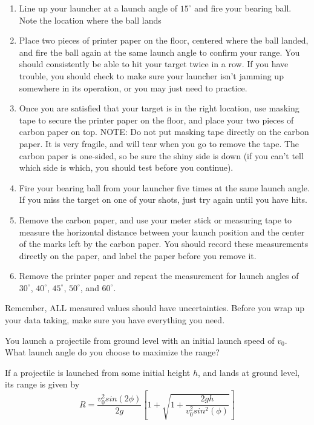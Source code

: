 \begin{enumerate}
    \item Line up your launcher at a launch angle of $15^\circ$ and fire your bearing ball. Note the location where the ball lands
    \item Place two pieces of printer paper on the floor, centered where the ball landed, and fire the ball again at the same launch angle to confirm your range. You should consistently be able to hit your target twice in a row. If you have trouble, you should check to make sure your launcher isn't jamming up somewhere in its operation, or you may just need to practice.
    \item Once you are satisfied that your target is in the right location, use masking tape to secure the printer paper on the floor, and place your two pieces of carbon paper on top.  NOTE: Do not put masking tape directly on the carbon paper. It is very fragile, and will tear when you go to remove the tape.  The carbon paper is one-sided, so be sure the shiny side is down (if you can't tell which side is which, you should test before you continue).
    \item Fire your bearing ball from your launcher five times at the same launch angle. If you miss the target on one of your shots, just try again until you have hits.
    \item Remove the carbon paper, and use your meter stick or measuring tape to measure the horizontal distance between your launch position and the center of the marks left by the carbon paper.  You should record these measurements directly on the paper, and label the paper before you remove it.
    \item Remove the printer paper and repeat the measurement for launch angles of $30^\circ$, $40^\circ$, $45^\circ$, $50^\circ$, and $60^\circ$.
\end{enumerate}

\selfcheck

Remember, ALL measured values should have uncertainties. Before you wrap up your data taking, make sure you have everything you need.

\prelab

\prelabquestion
You launch a projectile from ground level with an initial launch speed of $v_0$. What launch angle do you choose to maximize the range?

\prelabquestion
If a projectile is launched from some initial height $h$, and lands at ground level, its range is given by 
    \begin{equation*}\label{eqn:Range}
        R=\frac{v_0^2 sin(2\phi)}{2g}\left[ 1+\sqrt{1+\frac{2gh}{v_0^2 sin^2(\phi)}} \right]
    \end{equation*}
    

